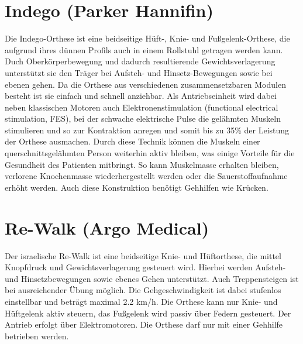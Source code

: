 \section{Indego (Parker Hannifin)}     
Die Indego-Orthese ist eine beidseitige Hüft-, Knie- und Fußgelenk-Orthese\citep{Murray.2014}, die aufgrund ihres dünnen Profils auch in einem Rollstuhl getragen werden kann. Duch Oberkörperbewegung und dadurch resultierende Gewichtsverlagerung unterstützt sie den Träger bei Aufsteh- und Hinsetz-Bewegungen sowie bei ebenen gehen\citep{Hartigan.2015}. Da die Orthese aus verschiedenen zusammensetzbaren Modulen besteht ist sie einfach und schnell anziehbar. Als Antriebseinheit wird dabei neben klassischen Motoren auch Elektronenstimulation (functional electrical stimulation, FES), bei der schwache elektrische Pulse die gelähmten Muskeln stimulieren und so zur Kontraktion anregen und somit bis zu 35\% der Leistung der Orthese ausmachen\citep{Ekelem.2015}. Durch diese Technik können die Muskeln einer querschnittsgelähmten Person weiterhin aktiv bleiben, was einige Vorteile für die Gesundheit des Patienten mitbringt\citep{Martin.2012}. So kann Muskelmasse erhalten bleiben\citep{Johnston.2005}, verlorene Knochenmasse wiederhergestellt werden\citep{Frotzler.2009}  oder die Sauerstoffaufnahme erhöht werden\citep{Bhambhani.2000}. Auch diese Konstruktion benötigt Gehhilfen wie Krücken. 
 
\section{Re-Walk (Argo Medical)}
Der israelische Re-Walk ist eine beidseitige Knie- und Hüftorthese, die mittel Knopfdruck und Gewichtsverlagerung gesteuert wird. Hierbei werden Aufsteh- und Hinsetzbewegungen sowie ebenes Gehen unterstützt. Auch Treppensteigen ist bei ausreichender Übung möglich. Die Gehgeschwindigkeit ist dabei stufenlos einstellbar und beträgt maximal 2.2 km/h\citep{Zeilig.2012}. Die Orthese kann nur Knie- und Hüftgelenk aktiv steuern, das Fußgelenk wird passiv über Federn gesteuert. Der Antrieb erfolgt über Elektromotoren. Die Orthese darf nur mit einer Gehhilfe betrieben werden. 

